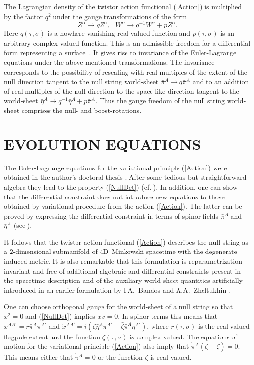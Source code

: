 \documentclass[a4paper,twocolumn,showkeys,showpacs,aps]{revtex4}
\begin{document}
The Lagrangian density of the twistor action functional
(\ref{Action}) is multiplied by the factor $q^2$ under the gauge
transformations of the form
\begin{equation}
Z^\alpha \rightarrow qZ^\alpha ,\,\,\,\, W^\alpha \rightarrow
q^{-1}W^\alpha + pZ^\alpha .
\end{equation}
Here $q(\tau ,\sigma)$ is a nowhere vanishing real-valued function
and $p(\tau,\sigma)$ is an arbitrary com\-plex-valued function.
This is an admissible freedom for a differential form representing
a surface~\cite{Schouten}. It gives rise to invariance of the
Euler-Lagrange equations under the above mentioned
transformations. The invariance corresponds to the possibility of
rescaling with real multiples of the extent of the null direction
tangent to the null string world-sheet $\bar{\pi}^A \rightarrow
q\bar{\pi}^A$ and to an addition of real multiples of the null
direction to the space-like direction tangent to the world-sheet
$\bar{\eta}^A \rightarrow q^{-1}\bar{\eta}^A + p\bar{\pi}^A$. Thus
the gauge freedom of the null string world-sheet comprises the
null- and boost-rotations.

\section{EVOLUTION EQUATIONS}

The Euler-Lagrange equations for the variational principle
(\ref{Action}) were obtained in the author's doctoral thesis
\cite{Disser}. After some tedious but straightforward algebra they
lead to the property (\ref{NullDet}) (cf.
\cite{Gusev-Zheltukhin}). In addition, one can show that the
differential constraint does not introduce new equations to those
obtained by variational procedure from the action (\ref{Action}).
The latter can be proved by expressing the differential constraint
in terms of spinor fields $\bar{\pi}{}^A$ and  $\bar{\eta}{}^A$
(see \cite{Disser}).

It follows that the twistor action functional (\ref{Action})
describes the null string as a 2-dimensional submanifold of
4D~Minkowski spacetime with the degenerate induced metric. It is
also remarkable that this formulation is reparametrization
invariant and free of additional algebraic and differential
constraints present in the spacetime description \cite{Stachel}
and of the auxiliary world-sheet quantities artificially
introduced in an earlier formulation by I.A.~Bandos and
A.A.~Zheltukhin \cite{Bandos-Zheltukhin2}.

One can choose orthogonal gauge for the world-sheet of a null
string so that $\dot{x}{}^2=0$ and (\ref{NullDet}) implies
$\dot{x}\acute{x}=0$. In spinor terms this means that
$\dot{x}{}^{AA'}=r\bar{\pi}{}^A\pi{}^{A'}$ and
$\acute{x}{}^{AA'}=i(\zeta\bar{\eta}^A\pi^{A'} -
\bar{\zeta}\bar{\pi}^A\eta^{A'})$, where $r(\tau,\sigma)$ is the
real-valued flagpole extent and the function $\zeta(\tau,\sigma)$
is complex valued. The equations of motion for the variational
principle (\ref{Action}) also imply that
$\dot{\bar{\pi}}{}^A(\zeta-\bar{\zeta})=0$. This means either that
$\dot{\bar{\pi}}{}^A=0$ or the function $\zeta$ is real-valued.
\end{document}
